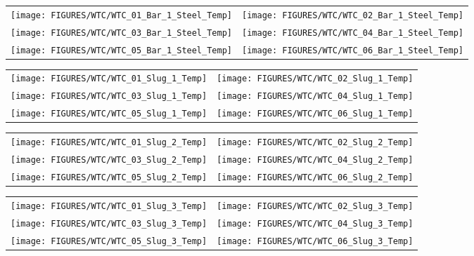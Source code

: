 \begin{figure}[p]
\begin{tabular*}{\textwidth}{l@{\extracolsep{\fill}}r}
\texttt{[image: FIGURES/WTC/WTC\_01\_Bar\_1\_Steel\_Temp]} &
\texttt{[image: FIGURES/WTC/WTC\_02\_Bar\_1\_Steel\_Temp]} \\
\texttt{[image: FIGURES/WTC/WTC\_03\_Bar\_1\_Steel\_Temp]} &
\texttt{[image: FIGURES/WTC/WTC\_04\_Bar\_1\_Steel\_Temp]} \\
\texttt{[image: FIGURES/WTC/WTC\_05\_Bar\_1\_Steel\_Temp]} &
\texttt{[image: FIGURES/WTC/WTC\_06\_Bar\_1\_Steel\_Temp]}
\end{tabular*}
\label{NIST_WTC_Bar_1_Steel_Temp}
\end{figure}

\begin{figure}[p]
\begin{tabular*}{\textwidth}{l@{\extracolsep{\fill}}r}
\texttt{[image: FIGURES/WTC/WTC\_01\_Slug\_1\_Temp]} &
\texttt{[image: FIGURES/WTC/WTC\_02\_Slug\_1\_Temp]} \\
\texttt{[image: FIGURES/WTC/WTC\_03\_Slug\_1\_Temp]} &
\texttt{[image: FIGURES/WTC/WTC\_04\_Slug\_1\_Temp]} \\
\texttt{[image: FIGURES/WTC/WTC\_05\_Slug\_1\_Temp]} &
\texttt{[image: FIGURES/WTC/WTC\_06\_Slug\_1\_Temp]}
\end{tabular*}
\label{NIST_WTC_Slug_1_Temp}
\end{figure}

\begin{figure}[p]
\begin{tabular*}{\textwidth}{l@{\extracolsep{\fill}}r}
\texttt{[image: FIGURES/WTC/WTC\_01\_Slug\_2\_Temp]} &
\texttt{[image: FIGURES/WTC/WTC\_02\_Slug\_2\_Temp]} \\
\texttt{[image: FIGURES/WTC/WTC\_03\_Slug\_2\_Temp]} &
\texttt{[image: FIGURES/WTC/WTC\_04\_Slug\_2\_Temp]} \\
\texttt{[image: FIGURES/WTC/WTC\_05\_Slug\_2\_Temp]} &
\texttt{[image: FIGURES/WTC/WTC\_06\_Slug\_2\_Temp]}
\end{tabular*}
\label{NIST_WTC_Slug_2_Temp}
\end{figure}

\begin{figure}[p]
\begin{tabular*}{\textwidth}{l@{\extracolsep{\fill}}r}
\texttt{[image: FIGURES/WTC/WTC\_01\_Slug\_3\_Temp]} &
\texttt{[image: FIGURES/WTC/WTC\_02\_Slug\_3\_Temp]} \\
\texttt{[image: FIGURES/WTC/WTC\_03\_Slug\_3\_Temp]} &
\texttt{[image: FIGURES/WTC/WTC\_04\_Slug\_3\_Temp]} \\
\texttt{[image: FIGURES/WTC/WTC\_05\_Slug\_3\_Temp]} &
\texttt{[image: FIGURES/WTC/WTC\_06\_Slug\_3\_Temp]}
\end{tabular*}
\label{NIST_WTC_Slug_3_Temp}
\end{figure}

